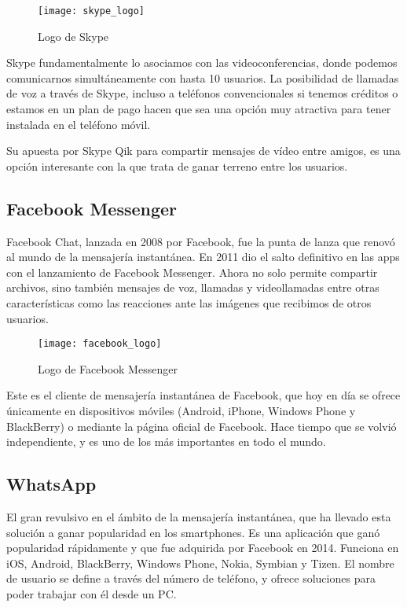 \begin{figure}[htp!]
  \centering
  \texttt{[image: skype\_logo]}
  \caption{Logo de Skype}
  \label{fig:skype_logo}
\end{figure}

Skype fundamentalmente lo asociamos con las videoconferencias, donde podemos comunicarnos simultáneamente con hasta 10 usuarios.  La posibilidad de llamadas de voz a través de Skype, incluso a teléfonos convencionales si tenemos créditos o estamos en un plan de pago hacen que sea una opción muy atractiva para tener instalada en el teléfono móvil.

Su apuesta por Skype Qik para compartir mensajes de vídeo entre amigos, es una opción interesante con la que trata de ganar terreno entre los usuarios.

\subsection{Facebook Messenger}

Facebook Chat, lanzada en 2008 por Facebook, fue la punta de lanza que renovó al mundo de la mensajería instantánea. En 2011 dio el salto definitivo en las apps con el lanzamiento de Facebook Messenger. Ahora no solo permite compartir archivos, sino también mensajes de voz, llamadas y videollamadas entre otras características como las reacciones ante las imágenes que recibimos de otros usuarios.

\begin{figure}[htp!]
  \centering
  \texttt{[image: facebook\_logo]}
  \caption{Logo de Facebook Messenger}
  \label{fig:facebook_logo}
\end{figure}

Este es el cliente de mensajería instantánea de Facebook, que hoy en día se ofrece únicamente en dispositivos móviles (Android, iPhone, Windows Phone y BlackBerry) o mediante la página oficial de Facebook. Hace tiempo que se volvió independiente, y es uno de los más importantes en todo el mundo.

\subsection{WhatsApp}

El gran revulsivo en el ámbito de la mensajería instantánea, que ha llevado esta solución a ganar popularidad en los smartphones. Es una aplicación que ganó popularidad rápidamente y que fue adquirida por Facebook en 2014. Funciona en iOS, Android, BlackBerry, Windows Phone, Nokia, Symbian y Tizen. El nombre de usuario se define a través del número de teléfono, y ofrece soluciones para poder trabajar con él desde un PC.

